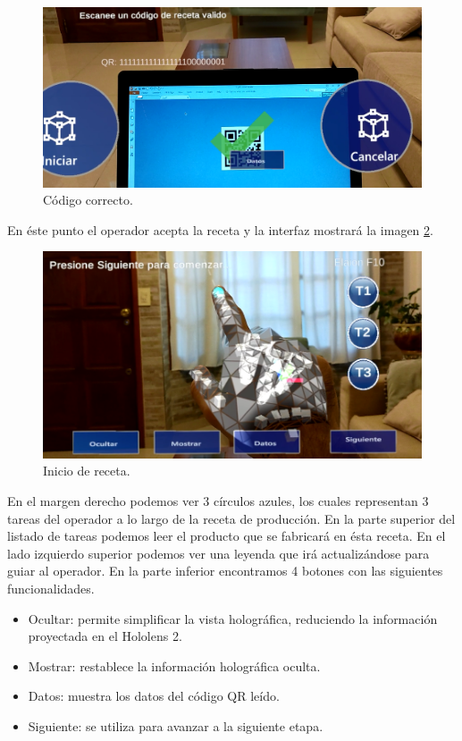 \begin{figure}[htpb]
	\centering
	\includegraphics[scale=.5]{./Figures/i4.PNG}
	\caption{Código correcto\protect\footnotemark.}
	\label{fig:i4}
\end{figure}

En éste punto el operador acepta la receta y la interfaz mostrará la imagen \ref{fig:i6}.

\begin{figure}[htpb]
	\centering
	\includegraphics[scale=.5]{./Figures/i6.PNG}
	\caption{Inicio de receta\protect\footnotemark.}
	\label{fig:i6}
\end{figure}

En el margen derecho podemos ver 3 círculos azules, los cuales representan 3 tareas del operador a lo largo de la receta de producción. En la parte superior del listado de tareas podemos leer el producto que se fabricará en ésta receta. En el lado izquierdo superior podemos ver una leyenda que irá actualizándose para guiar al operador. En la parte inferior encontramos 4 botones con las siguientes funcionalidades.

\begin{itemize}
\item Ocultar: permite simplificar la vista holográfica, reduciendo la información proyectada en el Hololens 2.
\item Mostrar: restablece la información holográfica oculta.
\item Datos: muestra los datos del código QR leído.
\item Siguiente: se utiliza para avanzar a la siguiente etapa.
\end{itemize}

